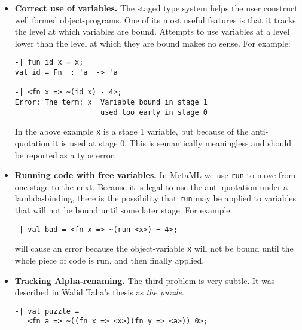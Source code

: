 \documentclass{sigplanconf}
\begin{document}
\begin{itemize}

\item{\bf Correct use of variables.} The staged type system helps the user
construct well formed object-programs. One of its most useful features is that
it tracks the level at which variables are bound. Attempts to use variables at
a level lower than the level at which they are bound makes no sense. For example:

\begin{verbatim}
-| fun id x = x;
val id = Fn  : 'a  -> 'a 

-| <fn x => ~(id x) - 4>;
Error: The term: x  Variable bound in stage 1 
                    used too early in stage 0
\end{verbatim}
In the above example {\tt x} is a stage 1 variable, but because of the
anti-quotation it is used at stage 0. This is semantically meaningless
and should be reported as a type error.\vspace*{0.1in}


\item{\bf Running code with free variables.}
In MetaML we use {\tt run} to move from one stage to the next. Because
it is legal to use the anti-quotation under a lambda-binding, there
is the possibility that {\tt run} may be applied to variables that will not
be bound until some later stage. For example:
{\small
\begin{verbatim}
-| val bad = <fn x => ~(run <x>) + 4>;
\end{verbatim}}

\noindent
will cause an error because the object-variable {\tt x} will not be bound until the
whole piece of code is run, and then finally applied. \vspace*{0.1in}

\item{\bf Tracking Alpha-renaming.} The third problem is very subtle. It was
described in Walid Taha's thesis as {\em the puzzle}.

\begin{verbatim}
-| val puzzle = 
   <fn a => ~((fn x => <x>)(fn y => <a>)) 0>;
\end{verbatim}


\end{itemize}
\end{document}
